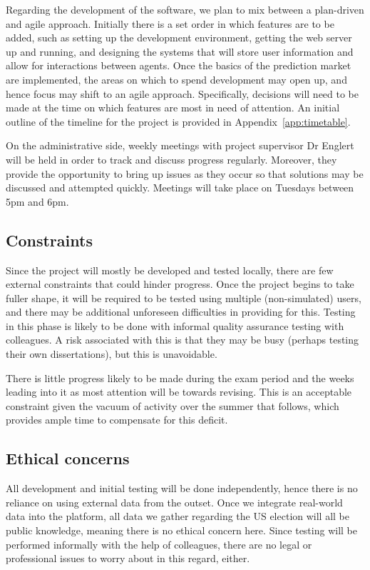 \documentclass[10pt,a4paper]{article}
\theoremstyle{plain}
\theoremstyle{definition}
\begin{document}
	Regarding the development of the software, we plan to mix between a
	plan-driven and agile approach. Initially there is a set order in which
	features are to be added, such as setting up the development environment,
	getting the web server up and running, and designing the systems that will
	store user information and allow for interactions between agents. Once the
	basics of the prediction market are implemented, the areas on which to
	spend development may open up, and hence focus may shift to an agile
	approach. Specifically, decisions will need to be made at the time on which
	features are most in need of attention. An initial outline of the timeline
	for the project is provided in Appendix~\ref{app:timetable}.

	On the administrative side, weekly meetings with project supervisor
	Dr Englert will be held in order to track and discuss progress regularly.
	Moreover, they provide the opportunity to bring up issues as they occur so
	that solutions may be discussed and attempted quickly. Meetings will take
	place on Tuesdays between 5pm and 6pm.

	\subsection{Constraints}

	Since the project will mostly be developed and tested locally, there are
	few external constraints that could hinder progress. Once the project
	begins to take fuller shape, it will be required to be tested using
	multiple (non-simulated) users, and there may be additional unforeseen
	difficulties in providing for this. Testing in this phase is likely to be
	done with informal quality assurance testing with colleagues. A risk
	associated with this is that they may be busy (perhaps testing their own
	dissertations), but this is unavoidable.

	There is little progress likely to be made during the exam period and the
	weeks leading into it as most attention will be towards revising. This is
	an acceptable constraint given the vacuum of activity over the summer that
	follows, which provides ample time to compensate for this deficit.

	\subsection{Ethical concerns}

	All development and initial testing will be done independently, hence there
	is no reliance on using external data from the outset. Once we integrate
	real-world data into the platform, all data we gather regarding the US
	election will all be public knowledge, meaning there is no ethical concern
	here. Since testing will be performed informally with the help of
	colleagues, there are no legal or professional issues to worry about in
	this regard, either.
\end{document}
